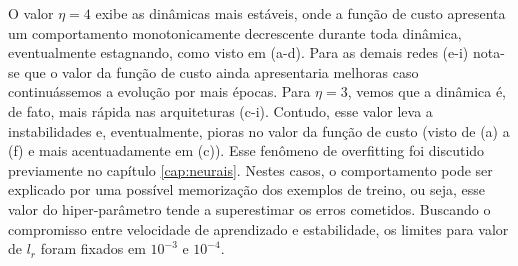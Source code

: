 O valor $\eta = 4$ exibe as dinâmicas mais estáveis, onde a função de custo apresenta um comportamento monotonicamente decrescente durante toda dinâmica, eventualmente estagnando, como visto em (a-d). Para as demais redes (e-i) nota-se que o valor da função de custo ainda apresentaria melhoras caso continuássemos a evolução por mais épocas. Para $\eta = 3$, vemos que a dinâmica é, de fato, mais rápida nas arquiteturas (c-i). Contudo, esse valor leva a instabilidades e, eventualmente, pioras no valor da função de custo (visto de (a) a (f) e mais acentuadamente em (c)). Esse fenômeno de overfitting foi discutido previamente no capítulo \ref{cap:neurais}. Nestes casos, o comportamento pode ser explicado por uma possível memorização dos exemplos de treino, ou seja, esse valor do hiper-parâmetro tende a superestimar os erros cometidos. Buscando o compromisso entre velocidade de aprendizado e estabilidade, os limites para valor de $l_r$ foram fixados em $10^{-3}$ e $10^{-4}$.  

